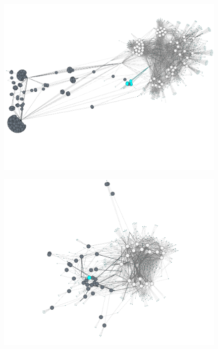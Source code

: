 \begin{landscape}
\begin{figure}
\begin{center}
\begin{minipage}[t]{0.40\textwidth}
\includegraphics[width=\textwidth]{./img/leptospir.png}
\label{figspiro}
\end{minipage}
\begin{minipage}[t]{0.40\textwidth}
\includegraphics[width=\textwidth]{./img/deinococcus.png}
\label{figdeino}
\end{minipage}
\\
\vspace{0.2cm}
\begin{minipage}[t]{0.40\textwidth}

\end{minipage}
\end{center}
\end{figure}
\end{landscape}
